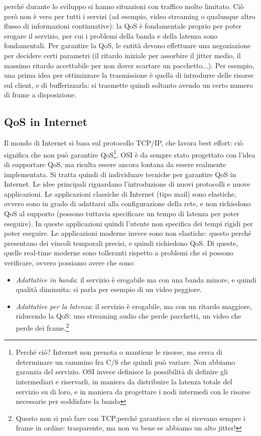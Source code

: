 perché durante lo sviluppo si hanno situazioni con traffico molto limitato. Ciò però non è vero per tutti i servizi
(ad esempio, video streaming o qualunque altro flusso di informazioni continuative): la QoS è fondamentale proprio per
poter erogare il servizio, per cui i problemi della banda e della latenza sono fondamentali. Per garantire la QoS, le
entità devono effettuare una negoziazione per decidere certi parametri (il ritardo iniziale per assorbire il jitter
medio, il massimo ritardo accettabile per non dover scartare un pacchetto...). Per esempio, una prima idea per
ottimizzare la trasmissione è quella di introdurre delle risorse sul client, e di bufferizzarla: si trasmette quindi
soltanto avendo un certo numero di frame a disposizione.
\subsection{QoS in Internet}
Il mondo di Internet si basa sul protocollo TCP/IP, che lavora best effort: ciò significa che non può garantire
QoS\footnote{Perché ciò? Internet non prenota o mantiene le risorse, ma cerca di determinare un cammino fra C/S che
quindi può variare. Non abbiamo garanzia del servizio. OSI invece definisce la possibilità di definire gli intermediari e riservarli, in maniera da distribuire la latenza totale del servizio su di loro, e in maniera da progettare i nodi intermedi con le risorse necessarie per soddisfare la banda}. OSI è da sempre stato progettato con l'idea di supportare QoS, ma risulta essere ancora lontana da essere realmente implementata. Si tratta quindi di individuare tecniche per garantire QoS in Internet. Le idee principali riguardano l'introduzione di nuovi protocolli e nuove applicazioni.
Le applicazioni classiche di Internet (tipo mail) sono elastiche, ovvero sono in grado di adattarsi alla configurazione
della rete, e non richiedono QoS al supporto (possono tuttavia specificare un tempo di latenza per poter eseguire).
In queste applicazioni quindi l'utente non specifica dei tempi rigidi per poter eseguire.
Le applicazioni moderne invece sono non elastiche: questo perché presentano dei vincoli temporali precisi, e quindi
richiedono QoS. Di queste, quelle real-time moderne sono tolleranti rispetto a problemi che si possono verificare,
ovvero possiamo avere che sono:
\begin{itemize}
 \item \textit{Adattative in banda}: il servizio è erogabile ma con una banda minore, e quindi qualità diminuita: si
 parla per esempio di un video peggiore.
 \item \textit{Adattative per la latenza}: il servizio è erogabile, ma con un ritardo maggiore, riducendo la QoS: uno
 streaming  audio che perde pacchetti, un video che perde dei frame.\footnote{Questo non si può fare con TCP,perché
garantisce  che si ricevano sempre i frame in ordine: trasparente, ma non va bene se abbiamo un alto jitter!}
\end{itemize}

